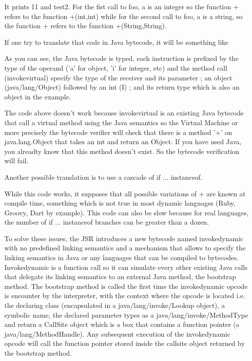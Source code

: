 \documentclass{sigplanconf}
\def \Jsr{JSR\xspace}
\begin{document}
      It prints 11 and test2. For the fist call to foo, a is an integer so the function + refers
      to the function +(int,int) while for the second call to foo, a is a string, so the
      function + refers to the function +(String,String).

      If one try to translate that code in Java bytecode, it will be something like

      

      As you can see, the Java bytecode is typed, each instruction is prefixed 
      by the type of the operand ('a' for object, 'i' for integer, etc)
      and the method call (invokevirtual) specify the type of the receiver and its parameter ;
      an object (java/lang/Object) followed by an int (I) ; and its return type
      which is also an object in the example.

      The code above doesn't work because invokevirtual is an existing Java bytecode that call
      a virtual method using the Java semantics so the Virtual Machine or more precisely
      the bytecode verifier will check that there is a method '+' on java.lang.Object
      that takes an int and return an Object. If you have used Java, you alreadty know
      that this method doesn't exist. So the bytecode verification will fail. 

      Another possible translation is to use a cascade of if ... instanceof.

      

      While this code works, it supposes that all possible variations of + are known at compile time,
      something which is not true in most dynamic languages (Ruby, Groovy, Dart by example).
      This code can also be slow because for real languages, the number of if ... instanceof branches
      can be greater than a dozen. 
      
      To solve these issues, the \Jsr introduces a new bytecode named invokedynamic with no predefined
      linking semantics and a mechanism that allows to specify the linking semantics in Java
      or any languages that can be compiled to bytecodes.
      Invokedynamic is a function call so it can simulate every other existing Java calls that delegate
      its linking semantics to an external Java method, the bootstrap method.
      The bootstrap method is called the first time the invokedynamic opcode is encounter by the interpreter,
      with the context where the opcode is located i.e.
      the declaring class (encapsulated in a java/lang/invoke/Lookup object), a symbolic name,
      the declared parameter types as a java/lang/invoke/MethodType and return
      a CallSite object which is a box that contains a function pointer (a java/lang/MethodHandle).
      Any subsequent execution of the invokedynamic opcode will call the function pointer
      stored inside the callsite object returned by the bootstrap method.
      
\end{document}
